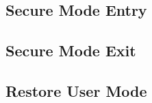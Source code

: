 
\subsection{Secure Mode Entry}

\label{Ch6 Sec3 Sub3}




\subsection{Secure Mode Exit}

\label{Ch6 Sec3 Sub4}



\subsection{Restore User Mode}

\label{Ch6 Sec3 Sub5}






